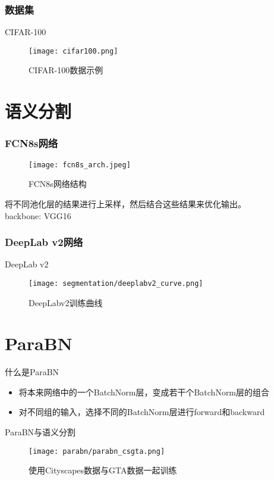 \documentclass[hyperref={unicode=true}]{beamer}
\theoremstyle{definition}
\theoremstyle{proof}
\begin{document}
\begin{frame}\frametitle{数据集}
  \begin{block}{CIFAR-100}
    \begin{figure}[!h]
      \centering
      \texttt{[image: cifar100.png]}
      \caption{CIFAR-100数据示例}
      \label{fig:cifar100_samples}
    \end{figure}
  \end{block}
\end{frame}

\section{语义分割}

\begin{frame}\frametitle{FCN8s网络}
  \begin{figure}[!h]
    \centering
    \texttt{[image: fcn8s\_arch.jpeg]}
    \caption{FCN8s网络结构}
    \label{fig:fcn8s_arch}
  \end{figure}
  将不同池化层的结果进行上采样，然后结合这些结果来优化输出。\\
  backbone: VGG16
\end{frame}


\begin{frame}\frametitle{DeepLab v2网络}
  \begin{block}{DeepLab v2}
    \begin{figure}[!h]
      \centering
      \texttt{[image: segmentation/deeplabv2\_curve.png]}
      \caption{DeepLabv2训练曲线}
      \label{fig:deeplabv2_curve}
    \end{figure}
  \end{block}
\end{frame}

\section{ParaBN}

\begin{frame}{什么是ParaBN}
  \begin{itemize}
  \item 将本来网络中的一个BatchNorm层，变成若干个BatchNorm层的组合
  \item 对不同组的输入，选择不同的BatchNorm层进行forward和backward
  \end{itemize}
\end{frame}

\begin{frame}{ParaBN与语义分割}
  \begin{figure}[!h]
    \centering
    \texttt{[image: parabn/parabn\_csgta.png]}
    \caption{使用Cityscapes数据与GTA数据一起训练}
    \label{fig:parabn_csgta}
  \end{figure}
\end{frame}
\end{document}
